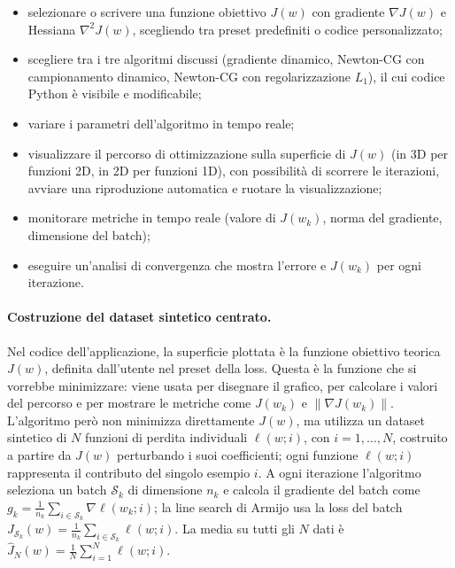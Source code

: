\documentclass[a4paper,12pt]{article}
\numberwithin{equation}{section}
\numberwithin{figure}{section}
\numberwithin{table}{section}
\begin{document}
\begin{itemize}
  \item selezionare o scrivere una funzione obiettivo $J(w)$ con gradiente
  $\nabla J(w)$ e Hessiana $\nabla^2 J(w)$, scegliendo tra preset predefiniti
  o codice personalizzato;
  \item scegliere tra i tre algoritmi discussi (gradiente dinamico,
  Newton-CG con campionamento dinamico, Newton-CG con regolarizzazione
  $L_1$), il cui codice Python è visibile e modificabile;
  \item variare i parametri dell'algoritmo in tempo reale;
  \item visualizzare il percorso di ottimizzazione sulla superficie di
  $J(w)$ (in 3D per funzioni 2D, in 2D per funzioni 1D), con possibilità di
  scorrere le iterazioni, avviare una riproduzione automatica e ruotare la
  visualizzazione;
  \item monitorare metriche in tempo reale (valore di $J(w_k)$, norma del
  gradiente, dimensione del batch);
  \item eseguire un'analisi di convergenza che mostra l'errore e $J(w_k)$
  per ogni iterazione.
\end{itemize}


\paragraph{Costruzione del dataset sintetico centrato.}
Nel codice dell'applicazione, la superficie plottata è la funzione obiettivo
teorica $J(w)$, definita dall'utente nel preset della loss. Questa è la
funzione che si vorrebbe minimizzare: viene usata per disegnare il grafico,
per calcolare i valori del percorso e per mostrare le metriche come $J(w_k)$
e $\|\nabla J(w_k)\|$. L'algoritmo però non minimizza direttamente $J(w)$,
ma utilizza un dataset sintetico di $N$ funzioni di perdita individuali
$\ell(w; i)$, con $i = 1,\dots,N$, costruito a partire da $J(w)$ perturbando
i suoi coefficienti; ogni funzione $\ell(w; i)$ rappresenta il contributo del
singolo esempio $i$. A ogni iterazione l'algoritmo seleziona un batch
$\mathcal{S}_k$ di dimensione $n_k$ e calcola il gradiente del batch come
$g_k = \frac{1}{n_k}\sum_{i \in \mathcal{S}_k}\nabla \ell(w_k; i)$; la line
search di Armijo usa la loss del batch
$J_{\mathcal{S}_k}(w) = \frac{1}{n_k}\sum_{i \in \mathcal{S}_k}\ell(w; i)$.
La media su tutti gli $N$ dati è
$\hat J_N(w) = \frac{1}{N}\sum_{i=1}^N \ell(w; i)$.
\end{document}
